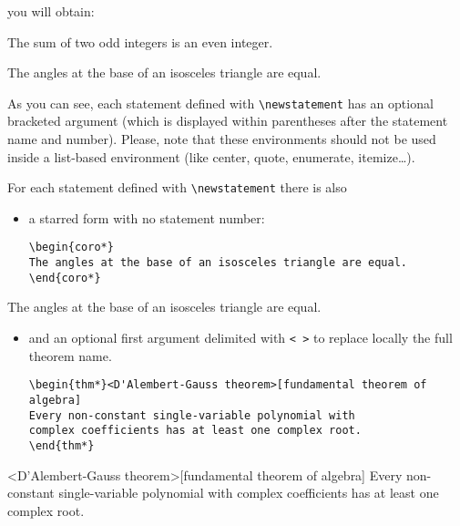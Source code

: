 \documentclass[english,ColorTheme=Red,FontSize=10pt]{tango}
\newcommand\TO[1]{\textsf{#1}}
\begin{document}
you will obtain:
\begin{propo}
The sum of two odd integers is an even integer.
\end{propo}
\begin{thm}
The angles at the base of an isosceles triangle are equal.
\end{thm}

As you can see, each statement defined with \verb+\newstatement+ has an optional bracketed argument (which is displayed within parentheses after the statement name and number). Please, note that these environments should not be used inside a \TO{list}-based environment (like center, quote, enumerate, itemize…).

For each statement defined with \verb+\newstatement+ there is also
\begin{itemize}
\item a starred form with no statement number:
\begin{tcolorbox}
\begin{verbatim}
\begin{coro*}
The angles at the base of an isosceles triangle are equal.
\end{coro*}
\end{verbatim}
\end{tcolorbox}
\end{itemize}
\begin{coro*}
The angles at the base of an isosceles triangle are equal.
\end{coro*}
\begin{itemize}
\item and an optional first argument delimited with \verb+< >+ to replace locally the full theorem name.
\begin{tcolorbox}
\begin{verbatim}
\begin{thm*}<D'Alembert-Gauss theorem>[fundamental theorem of algebra]
Every non-constant single-variable polynomial with
complex coefficients has at least one complex root.
\end{thm*}
\end{verbatim}
\end{tcolorbox}
\end{itemize}
\begin{thm*}<D'Alembert-Gauss theorem>[fundamental theorem of algebra]
Every non-constant single-variable polynomial with complex coefficients has at least one complex root.
\end{thm*}
\end{document}
